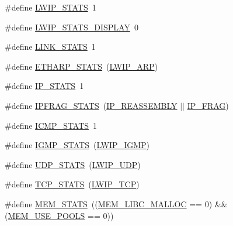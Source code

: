\begin{DoxyCompactItemize}
\item 
\#define \hyperlink{group__lwip__opts__stats_ga542b58734cc01902c5e099f6efdc5f1b}{L\+W\+I\+P\+\_\+\+S\+T\+A\+TS}~1
\item 
\#define \hyperlink{group__lwip__opts__stats_gacdc38ed58d1900b5d3d109a65be1c3d1}{L\+W\+I\+P\+\_\+\+S\+T\+A\+T\+S\+\_\+\+D\+I\+S\+P\+L\+AY}~0
\item 
\#define \hyperlink{group__lwip__opts__stats_gae58b452782d0327ae728192686c5a84a}{L\+I\+N\+K\+\_\+\+S\+T\+A\+TS}~1
\item 
\#define \hyperlink{group__lwip__opts__stats_ga3a8359abf4fff8ffdc449e5007f93275}{E\+T\+H\+A\+R\+P\+\_\+\+S\+T\+A\+TS}~(\hyperlink{group__lwip__opts__arp_ga9609a014bba4638cc191d6a8f9556c87}{L\+W\+I\+P\+\_\+\+A\+RP})
\item 
\#define \hyperlink{group__lwip__opts__stats_gaf50575a4895e26ea2c01d1f2269487be}{I\+P\+\_\+\+S\+T\+A\+TS}~1
\item 
\#define \hyperlink{group__lwip__opts__stats_gac9a4fbb46df3c0f479a334d0e34fb74f}{I\+P\+F\+R\+A\+G\+\_\+\+S\+T\+A\+TS}~(\hyperlink{group__lwip__opts__ipv4_ga1a31ab0e0f37b17d40fa7c35bc2c4f69}{I\+P\+\_\+\+R\+E\+A\+S\+S\+E\+M\+B\+LY} $\vert$$\vert$ \hyperlink{group__lwip__opts__ipv4_gaf85c8bdd5035b6cada790b4cc2a209a4}{I\+P\+\_\+\+F\+R\+AG})
\item 
\#define \hyperlink{group__lwip__opts__stats_ga472ad3f6da741f5b287d66ad3051242b}{I\+C\+M\+P\+\_\+\+S\+T\+A\+TS}~1
\item 
\#define \hyperlink{group__lwip__opts__stats_ga4d12af1356b9fd60717984be51e27740}{I\+G\+M\+P\+\_\+\+S\+T\+A\+TS}~(\hyperlink{openmote-cc2538_2lwip_2test_2unit_2lwipopts_8h_adaf25915ae1fd69c0943ef68cbb38923}{L\+W\+I\+P\+\_\+\+I\+G\+MP})
\item 
\#define \hyperlink{group__lwip__opts__stats_gaef64b11bf71f0d6d5bafaf6092462276}{U\+D\+P\+\_\+\+S\+T\+A\+TS}~(\hyperlink{group__lwip__opts__udp_gab6030e96e72df649d2650fd32d7a67b3}{L\+W\+I\+P\+\_\+\+U\+DP})
\item 
\#define \hyperlink{group__lwip__opts__stats_gaa02ec5c5bc0edebe418680c54d044f58}{T\+C\+P\+\_\+\+S\+T\+A\+TS}~(\hyperlink{group__lwip__opts__tcp_gaa4ed98deb97b77c633cb8870f34c71e9}{L\+W\+I\+P\+\_\+\+T\+CP})
\item 
\#define \hyperlink{group__lwip__opts__stats_ga61ec04a08c4fde690d10819e582656a7}{M\+E\+M\+\_\+\+S\+T\+A\+TS}~((\hyperlink{group__lwip__opts__mem_ga4ef345cc270912bd2230b1c5ec51dfc8}{M\+E\+M\+\_\+\+L\+I\+B\+C\+\_\+\+M\+A\+L\+L\+OC} == 0) \&\& (\hyperlink{group__lwip__opts__mem_gaddca3141bc7037241769eb152b6f89ba}{M\+E\+M\+\_\+\+U\+S\+E\+\_\+\+P\+O\+O\+LS} == 0))
$$
\end{DoxyCompactItemize}
